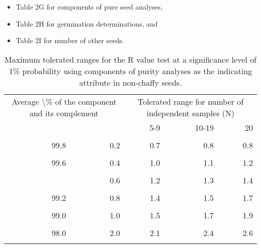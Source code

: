 \documentclass[
]{book}
\providecommand{\tightlist}{%
  \setlength{\itemsep}{0pt}\setlength{\parskip}{0pt}}
\begin{document}
\begin{itemize}
\tightlist
\item
  Table 2G for components of pure seed analyses,
\item
  Table 2H for germination determinations, and
\item
  Table 2I for number of other seeds.
\end{itemize}

\begin{longtable}[t]{rrrrr}
\caption{\label{tab:purity-r-non-chaffy}Maximum tolerated ranges for the R value test at a significance level of 1\% probability using components of purity analyses as the indicating attribute in non-chaffy seeds.}\\
\toprule
\multicolumn{2}{c}{Average \textbackslash{}\% of the component and its complement} & \multicolumn{3}{c}{Tolerated range for number of independent samples (N)} \\
\cmidrule(l{3pt}r{3pt}){1-2} \cmidrule(l{3pt}r{3pt}){3-5}
 &  & 5-9 & 10-19 & 20\\
\midrule
\cellcolor{gray!6}{99.9} & \cellcolor{gray!6}{0.1} & \cellcolor{gray!6}{0.5} & \cellcolor{gray!6}{0.5} & \cellcolor{gray!6}{0.6}\\
99.8 & 0.2 & 0.7 & 0.8 & 0.8\\
\cellcolor{gray!6}{99.7} & \cellcolor{gray!6}{0.3} & \cellcolor{gray!6}{0.8} & \cellcolor{gray!6}{0.9} & \cellcolor{gray!6}{1.0}\\
99.6 & 0.4 & 1.0 & 1.1 & 1.2\\
\cellcolor{gray!6}{99.5} & \cellcolor{gray!6}{0.5} & \cellcolor{gray!6}{1.1} & \cellcolor{gray!6}{1.2} & \cellcolor{gray!6}{1.3}\\
\addlinespace
99.4 & 0.6 & 1.2 & 1.3 & 1.4\\
\cellcolor{gray!6}{99.3} & \cellcolor{gray!6}{0.7} & \cellcolor{gray!6}{1.3} & \cellcolor{gray!6}{1.4} & \cellcolor{gray!6}{1.6}\\
99.2 & 0.8 & 1.4 & 1.5 & 1.7\\
\cellcolor{gray!6}{99.1} & \cellcolor{gray!6}{0.9} & \cellcolor{gray!6}{1.4} & \cellcolor{gray!6}{1.6} & \cellcolor{gray!6}{1.8}\\
99.0 & 1.0 & 1.5 & 1.7 & 1.9\\
\addlinespace
\cellcolor{gray!6}{98.5} & \cellcolor{gray!6}{1.5} & \cellcolor{gray!6}{1.9} & \cellcolor{gray!6}{2.1} & \cellcolor{gray!6}{2.3}\\
98.0 & 2.0 & 2.1 & 2.4 & 2.6\\
\cellcolor{gray!6}{97.5} & \cellcolor{gray!6}{2.5} & \cellcolor{gray!6}{2.4} & \cellcolor{gray!6}{2.7} & \cellcolor{gray!6}{2.9}\\

\end{longtable}
\end{document}

